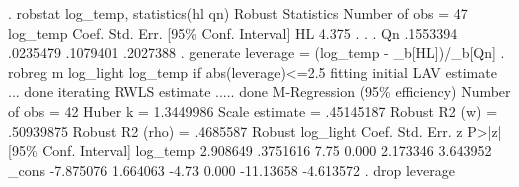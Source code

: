 . robstat log_temp, statistics(hl qn)
{\smallskip}
Robust Statistics                 Number of obs   =         47
{\smallskip}
    log_temp {\VBAR}      Coef.   Std. Err.     [95\% Conf. Interval]
          HL {\VBAR}      4.375          .             .           .
          Qn {\VBAR}   .1553394   .0235479      .1079401    .2027388
{\smallskip}
. generate leverage = (log_temp - _b[HL])/_b[Qn]
{\smallskip}
. robreg m log_light log_temp if abs(leverage)<=2.5
fitting initial LAV estimate ... done
iterating RWLS estimate ..... done
{\smallskip}
M-Regression (95\% efficiency)                   Number of obs     =         42
                                                  Huber k         =  1.3449986
                                                  Scale estimate  =  .45145187
                                                  Robust R2 (w)   =  .50939875
                                                  Robust R2 (rho) =   .4685587
{\smallskip}
             {\VBAR}               Robust
   log_light {\VBAR}      Coef.   Std. Err.      z    P>|z|     [95\% Conf. Interval]
    log_temp {\VBAR}   2.908649   .3751616     7.75   0.000     2.173346    3.643952
       _cons {\VBAR}  -7.875076   1.664063    -4.73   0.000    -11.13658   -4.613572
{\smallskip}
. drop leverage
{\smallskip}
